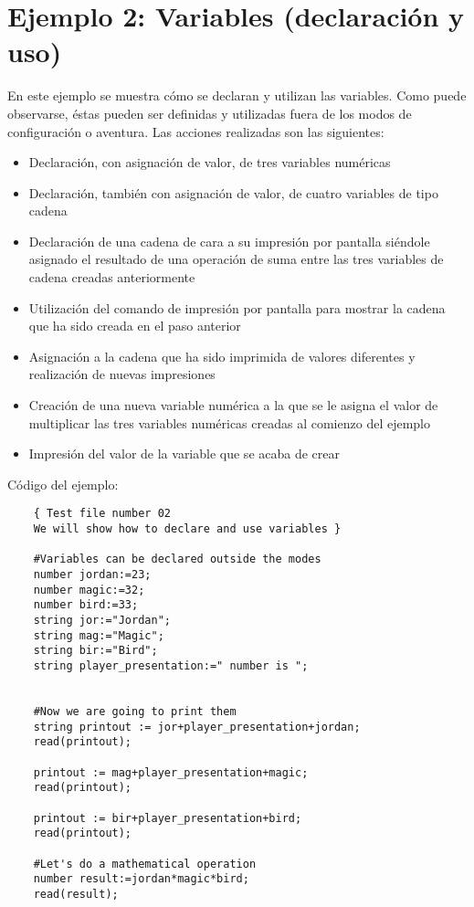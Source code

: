 \documentclass[a4paper,12pt,twoside,openright]{report}
\begin{document}
  
  \section{Ejemplo 2: Variables (declaración y uso)}
  En este ejemplo se muestra cómo se declaran y utilizan las variables. Como puede observarse, éstas pueden ser 
  definidas y utilizadas fuera de los modos de configuración o aventura. Las acciones realizadas son las siguientes:
  \begin{itemize}
   \item Declaración, con asignación de valor, de tres variables numéricas
   \item Declaración, también con asignación de valor, de cuatro variables de tipo cadena
   \item Declaración de una cadena de cara a su impresión por pantalla siéndole asignado el resultado de una operación 
   de suma entre las tres variables de cadena creadas anteriormente
   \item Utilización del comando de impresión por pantalla para mostrar la cadena que ha sido creada en el paso anterior
   \item Asignación a la cadena que ha sido imprimida de valores diferentes y realización de nuevas impresiones
   \item Creación de una nueva variable numérica a la que se le asigna el valor de multiplicar las tres variables numéricas 
   creadas al comienzo del ejemplo
   \item Impresión del valor de la variable que se acaba de crear
  \end{itemize}

  Código del ejemplo:
  \begin{lstlisting}
    { Test file number 02
    We will show how to declare and use variables }

    #Variables can be declared outside the modes
    number jordan:=23;
    number magic:=32;
    number bird:=33;
    string jor:="Jordan";
    string mag:="Magic";
    string bir:="Bird";
    string player_presentation:=" number is ";


    #Now we are going to print them
    string printout := jor+player_presentation+jordan;
    read(printout);

    printout := mag+player_presentation+magic;
    read(printout);

    printout := bir+player_presentation+bird;
    read(printout);

    #Let's do a mathematical operation
    number result:=jordan*magic*bird;
    read(result);
  \end{lstlisting}
\end{document}
